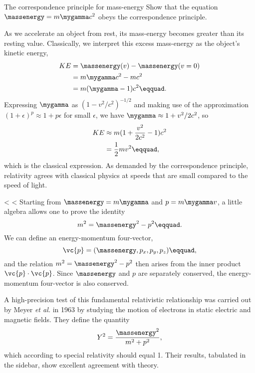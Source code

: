 \begin{eg}{The correspondence principle for mass-energy}
\egquestion Show that the equation $\massenergy=m\mygamma c^2$ obeys the correspondence principle.

\eganswer As we accelerate an object from rest, its mass-energy becomes greater than
its resting value. Classically, we interpret this excess mass-energy as the object's
kinetic energy,
\begin{align*}
  KE   &= \massenergy(v)-\massenergy(v=0) \\
       &= m\mygamma c^2 - m c^2 \\
       &= m(\mygamma-1)c^2\eqquad.
\end{align*}
Expressing $\mygamma$ as $\left(1-v^2/c^2\right)^{-1/2}$ and making use of the
approximation $(1+\epsilon)^p\approx 1+p\epsilon$ for small $\epsilon$, we have
$\mygamma\approx 1+v^2/2c^2$, so
\begin{align*}
  KE   &\approx m(1+\frac{v^2}{2c^2}-1)c^2 \\
       &= \frac{1}{2}mv^2\eqquad,
\end{align*}
which is the classical expression. As demanded by the correspondence principle,
relativity agrees with classical physics at speeds that are small compared to
the speed of light.
\end{eg}

<%
<%
Starting from $\massenergy=m\mygamma$ and $p=m\mygamma v$, a little algebra allows one to prove the identity
\begin{equation*}
  m^2 = \massenergy^2 - p^2\eqquad.
\end{equation*}
We can define an energy-momentum four-vector,
\begin{equation*}
  \vc{p} = (\massenergy,p_x,p_y,p_z)\eqquad,
\end{equation*}
and the relation $m^2 = \massenergy^2 - p^2$ then arises from the inner product $\vc{p}\cdot\vc{p}$.
Since $\massenergy$ and $p$ are separately conserved, the energy-momentum four-vector is also conserved.

A high-precision test of this fundamental relativistic relationship was carried out by Meyer \emph{et al.}
in 1963 by studying the motion of electrons in static electric and magnetic fields. They define the quantity
\begin{equation*}
  Y^2 = \frac{\massenergy^2}{m^2+p^2},
\end{equation*}
which according to special relativity should equal 1. Their results, tabulated in the sidebar,
show excellent agreement with theory.

